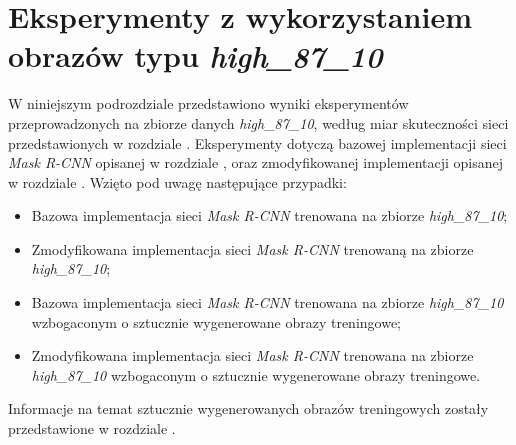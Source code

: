 \section{Eksperymenty z wykorzystaniem obrazów typu \textit{high\_87\_10}}
\label{sec:experymenty_high}
W niniejszym podrozdziale przedstawiono wyniki eksperymentów przeprowadzonych na zbiorze danych \textit{high\_87\_10}, według miar skuteczności sieci przedstawionych w rozdziale .
Eksperymenty dotyczą bazowej implementacji sieci \textit{Mask R-CNN} \cite{matterport-mask-rcnn} opisanej w rozdziale , oraz zmodyfikowanej implementacji opisanej w rozdziale .
 Wzięto pod uwagę następujące przypadki:

\begin{itemize}
 \item Bazowa implementacja sieci \textit{Mask R-CNN} trenowana na zbiorze \textit{high\_87\_10};
 \item Zmodyfikowana implementacja sieci \textit{Mask R-CNN} trenowaną na zbiorze \textit{high\_87\_10};
 \item Bazowa implementacja sieci \textit{Mask R-CNN} trenowana na zbiorze \textit{high\_87\_10} wzbogaconym o sztucznie wygenerowane obrazy treningowe;
 \item Zmodyfikowana implementacja sieci \textit{Mask R-CNN} trenowana na zbiorze \textit{high\_87\_10} wzbogaconym o sztucznie wygenerowane obrazy treningowe.
\end{itemize}

Informacje na temat sztucznie wygenerowanych obrazów treningowych zostały przedstawione w rozdziale .
